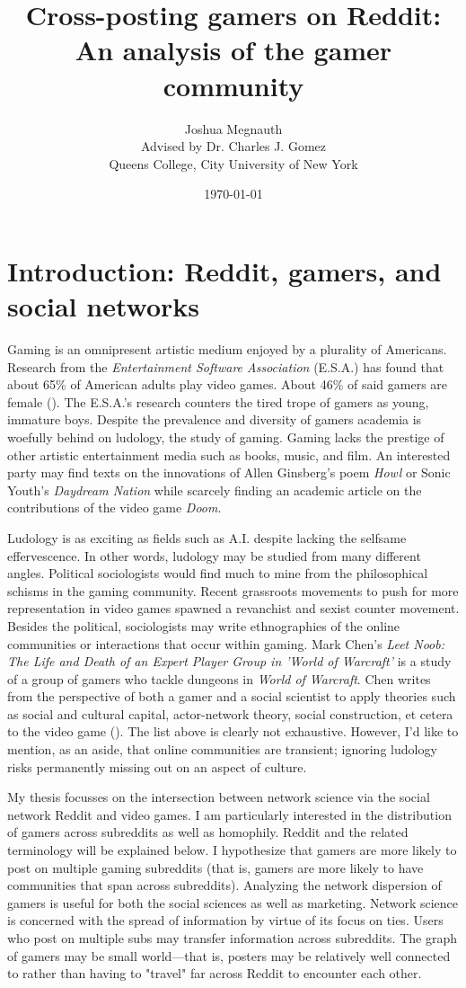 \documentclass[12pt, a4paper]{article}
\title{Cross-posting gamers on Reddit: An analysis of the gamer community}
\author{Joshua Megnauth\\[1cm]{\small Advised by Dr. Charles J. Gomez}\\{\small Queens College, City University of New York}}
\date{\today}
\begin{document}
\maketitle

\section{Introduction: Reddit, gamers, and social networks}
Gaming is an omnipresent artistic medium enjoyed by a plurality of Americans. Research from the \textit{Entertainment Software Association} (E.S.A.) has found that about 65\% of American adults play video games. About 46\% of said gamers are female (\cite{esagamers}). The E.S.A.'s research counters the tired trope of gamers as young, immature boys. Despite the prevalence and diversity of gamers academia is woefully behind on ludology, the study of gaming. Gaming lacks the prestige of other artistic entertainment media such as books, music, and film. An interested party may find texts on the innovations of Allen Ginsberg's poem \textit{Howl} or Sonic Youth's \textit{Daydream Nation} while scarcely finding an academic article on the contributions of the video game \textit{Doom}.

Ludology is as exciting as fields such as A.I. despite lacking the selfsame effervescence. In other words, ludology may be studied from many different angles. Political sociologists would find much to mine from the philosophical schisms in the gaming community. Recent grassroots movements to push for more representation in video games spawned a revanchist and sexist counter movement. Besides the political, sociologists may write ethnographies of the online communities or interactions that occur within gaming. Mark Chen's \textit{Leet Noob: The Life and Death of an Expert Player Group in 'World of Warcraft'} is a study of a group of gamers who tackle dungeons in \textit{World of Warcraft}. Chen writes from the perspective of both a gamer and a social scientist to apply theories such as social and cultural capital, actor-network theory, social construction, et cetera to the video game (\cite{chenwow}). The list above is clearly not exhaustive. However, I'd like to mention, as an aside, that online communities are transient; ignoring ludology risks permanently missing out on an aspect of culture.

My thesis focusses on the intersection between network science via the social network Reddit and video games. I am particularly interested in the distribution of gamers across subreddits as well as homophily. Reddit and the related terminology will be explained below. I hypothesize that gamers are more likely to post on multiple gaming subreddits (that is, gamers are more likely to have communities that span across subreddits). Analyzing the network dispersion of gamers is useful for both the social sciences as well as marketing. Network science is concerned with the spread of information by virtue of its focus on ties. Users who post on multiple subs may transfer information across subreddits. The graph of gamers may be small world---that is, posters may be relatively well connected to rather than having to "travel" far across Reddit to encounter each other.
\end{document}
